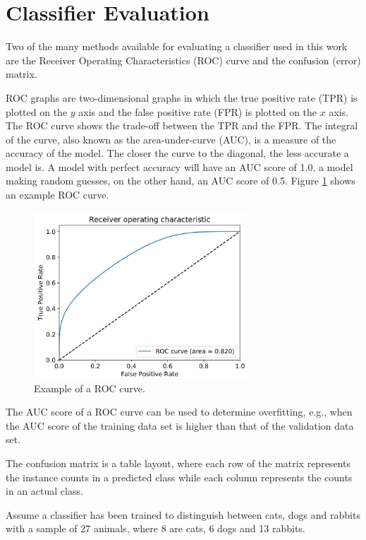 \section{Classifier Evaluation}
\label{sec:ch_3_eval}
Two of the many methods available for evaluating a classifier used in this work are the Receiver Operating Characteristics (ROC) curve and the confusion (error) matrix.

ROC graphs are two-dimensional graphs in which the true positive rate (TPR) is plotted on the $y$ axis and the false positive rate (FPR) is plotted on the $x$ axis. The ROC curve shows the trade-off between the TPR and the FPR. The integral of the curve, also known as the area-under-curve (AUC), is a measure of the accuracy of the model. The closer the curve to the diagonal, the less accurate a model is. A model with perfect accuracy will have an AUC score of 1.0, a model making random guesses, on the other hand, an AUC score of 0.5. Figure \ref{fig:ch_3_roc} shows an example ROC curve.
\begin{figure}[H]
    \centering
    \includegraphics[width=8cm]{assets/chap03/roc.png}
    \caption{Example of a ROC curve.}
    \label{fig:ch_3_roc}
\end{figure}
The AUC score of a ROC curve can be used to determine overfitting, e.g., when the AUC score of the training data set is higher than that of the validation data set.

The confusion matrix is a table layout, where each row of the matrix represents the instance counts in a predicted class while each column represents the counts in an actual class.

Assume a classifier has been trained to distinguish between cats, dogs and rabbits with a sample of 27 animals, where 8 are cats, 6 dogs and 13 rabbits.

